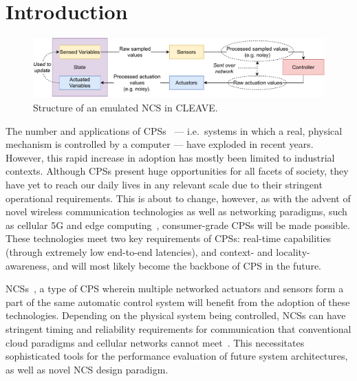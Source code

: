 \section{Introduction}\label{sec:intro}

\begin{figure}
    \centering
    \includegraphics[width=.8\textwidth]{publications/2022CLEAVE/images/CLEAVE_NCS_structure}
    \caption{
        Structure of an emulated \acl*{NCS} in \acs*{CLEAVE}.
    }\label{fig:cleave:ncs:struct}
\end{figure}

The number and applications of \acp{CPS}~\cite{Rajkumar2010CPS} --- i.e.\ systems in which a real, physical mechanism is controlled by a computer --- have exploded in recent years.
However, this rapid increase in adoption has mostly been limited to industrial contexts.
Although \acp{CPS} present huge opportunities for all facets of society, they have yet to reach our daily lives in any relevant scale due to their stringent operational requirements.
This is about to change, however, as with the advent of novel wireless communication technologies as well as networking paradigms, such as cellular 5G and edge computing~\cite{Satya2017Emergence}, consumer-grade \acp{CPS} will be made possible.
These technologies meet two key requirements of \acp{CPS}: real-time capabilities (through extremely low end-to-end latencies), and context- and locality-awareness, and will most likely become the backbone of \gls{CPS} in the future.

\acp{NCS}~\cite{Gupta2010NCSOverview}, a type of \gls{CPS} wherein multiple networked actuators and sensors form a part of the same automatic control system will benefit from the adoption of these technologies.
Depending on the physical system being controlled, \acp{NCS} can have stringent timing and reliability requirements for communication that conventional cloud paradigms and cellular networks cannot meet~\cite{Wan2020Efficient}.
This necessitates sophisticated tools for the performance evaluation of future system architectures, as well as novel NCS design paradigm.


